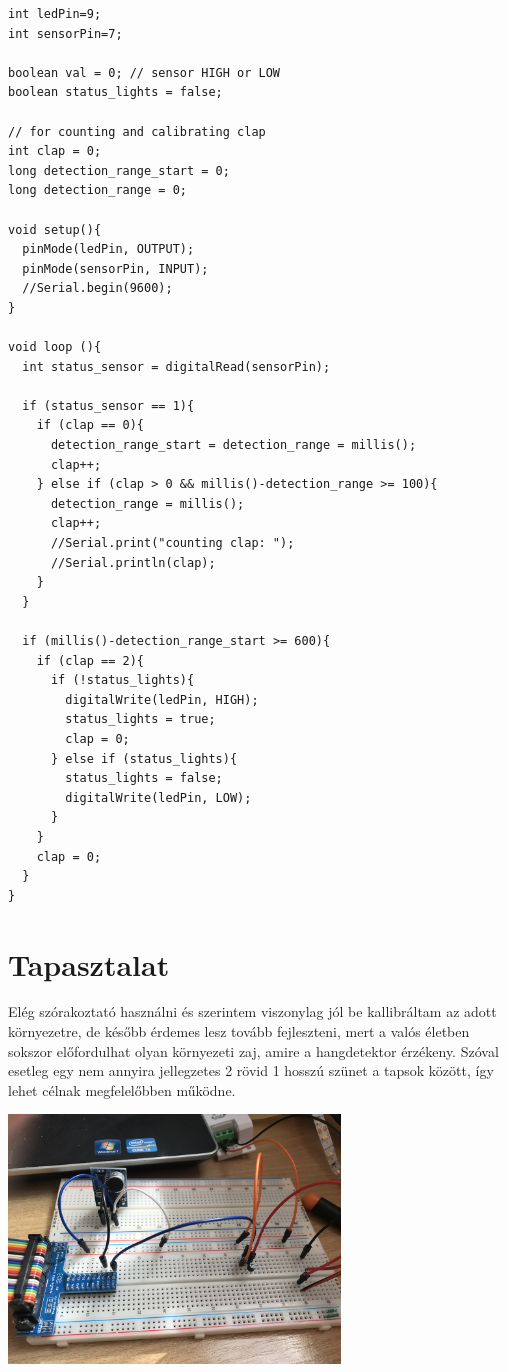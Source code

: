 \documentclass[a4paper,11pt]{article}
\begin{document}
\begin{lstlisting}
int ledPin=9;
int sensorPin=7;

boolean val = 0; // sensor HIGH or LOW
boolean status_lights = false;

// for counting and calibrating clap
int clap = 0;
long detection_range_start = 0;
long detection_range = 0;

void setup(){
  pinMode(ledPin, OUTPUT);
  pinMode(sensorPin, INPUT);
  //Serial.begin(9600);
}
  
void loop (){
  int status_sensor = digitalRead(sensorPin);
  
  if (status_sensor == 1){
    if (clap == 0){
      detection_range_start = detection_range = millis();
      clap++; 
    } else if (clap > 0 && millis()-detection_range >= 100){
      detection_range = millis();
      clap++;
      //Serial.print("counting clap: ");
      //Serial.println(clap);
    }
  }
  
  if (millis()-detection_range_start >= 600){
    if (clap == 2){ 
      if (!status_lights){
        digitalWrite(ledPin, HIGH);
        status_lights = true;
        clap = 0;
      } else if (status_lights){
        status_lights = false;
        digitalWrite(ledPin, LOW);
      }
    }
    clap = 0;
  }
}
\end{lstlisting} 

\section{Tapasztalat}

Elég szórakoztató használni és szerintem viszonylag jól be kallibráltam az adott környezetre, de később érdemes lesz tovább fejleszteni, mert a valós életben sokszor előfordulhat olyan környezeti zaj, amire a hangdetektor érzékeny. Szóval esetleg egy nem annyira jellegzetes 2 rövid 1 hosszú szünet a tapsok között, így lehet célnak megfelelőbben működne.

\begin{center}
\includegraphics[width=0.66\textwidth]{clapping_lamp.jpg}
\end{center}
\end{document}
